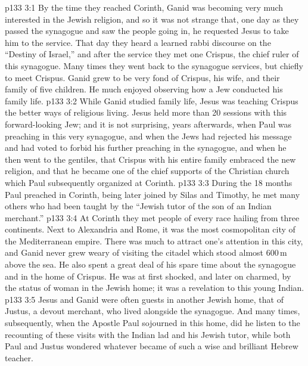 \vs p133 3:1 By the time they reached Corinth, Ganid was becoming very much interested in the Jewish religion, and so it was not strange that, one day as they passed the synagogue and saw the people going in, he requested Jesus to take him to the service. That day they heard a learned rabbi discourse on the “Destiny of Israel,” and after the service they met one Crispus, the chief ruler of this synagogue. Many times they went back to the synagogue services, but chiefly to meet Crispus. Ganid grew to be very fond of Crispus, his wife, and their family of five children. He much enjoyed observing how a Jew conducted his family life.
\vs p133 3:2 While Ganid studied family life, Jesus was teaching Crispus the better ways of religious living. Jesus held more than 20 sessions with this forward\hyp{}looking Jew; and it is not surprising, years afterwards, when Paul was preaching in this very synagogue, and when the Jews had rejected his message and had voted to forbid his further preaching in the synagogue, and when he then went to the gentiles, that Crispus with his entire family embraced the new religion, and that he became one of the chief supports of the Christian church which Paul subsequently organized at Corinth.
\vs p133 3:3 During the 18 months Paul preached in Corinth, being later joined by Silas and Timothy, he met many others who had been taught by the “Jewish tutor of the son of an Indian merchant.”
\vs p133 3:4 At Corinth they met people of every race hailing from three continents. Next to Alexandria and Rome, it was the most cosmopolitan city of the Mediterranean empire. There was much to attract one’s attention in this city, and Ganid never grew weary of visiting the citadel which stood almost 600\,m above the sea. He also spent a great deal of his spare time about the synagogue and in the home of Crispus. He was at first shocked, and later on charmed, by the status of woman in the Jewish home; it was a revelation to this young Indian.
\vs p133 3:5 Jesus and Ganid were often guests in another Jewish home, that of Justus, a devout merchant, who lived alongside the synagogue. And many times, subsequently, when the Apostle Paul sojourned in this home, did he listen to the recounting of these visits with the Indian lad and his Jewish tutor, while both Paul and Justus wondered whatever became of such a wise and brilliant Hebrew teacher.
